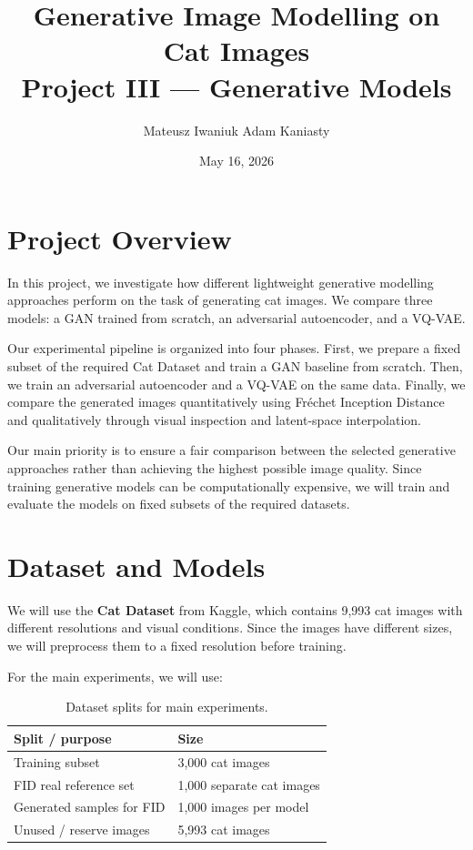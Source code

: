 \documentclass[11pt,a4paper]{article}
\title{Generative Image Modelling on Cat Images \\ \large Project III --- Generative Models}
\author{Mateusz Iwaniuk \quad Adam Kaniasty}
\date{May 16, 2026}
\begin{document}
\maketitle

\section{Project Overview}
In this project, we investigate how different lightweight generative modelling approaches perform on the task of generating cat images. We compare three models: a GAN trained from scratch, an adversarial autoencoder, and a VQ-VAE.

Our experimental pipeline is organized into four phases. First, we prepare a fixed subset of the required Cat Dataset and train a GAN baseline from scratch. Then, we train an adversarial autoencoder and a VQ-VAE on the same data. Finally, we compare the generated images quantitatively using Fr\'echet Inception Distance and qualitatively through visual inspection and latent-space interpolation.

Our main priority is to ensure a fair comparison between the selected generative approaches rather than achieving the highest possible image quality. Since training generative models can be computationally expensive, we will train and evaluate the models on fixed subsets of the required datasets.

\section{Dataset and Models}
We will use the \textbf{Cat Dataset} from Kaggle, which contains 9,993 cat images with different resolutions and visual conditions. Since the images have different sizes, we will preprocess them to a fixed resolution before training.

For the main experiments, we will use:
\begin{table}[h]
\centering
\caption{Dataset splits for main experiments.}
\begin{tabular}{@{}ll@{}}
\toprule
\textbf{Split / purpose} & \textbf{Size} \\ \midrule
Training subset & 3,000 cat images \\
FID real reference set & 1,000 separate cat images \\
Generated samples for FID & 1,000 images per model \\
Unused / reserve images & 5,993 cat images \\ \bottomrule
\end{tabular}
\end{table}
\end{document}
